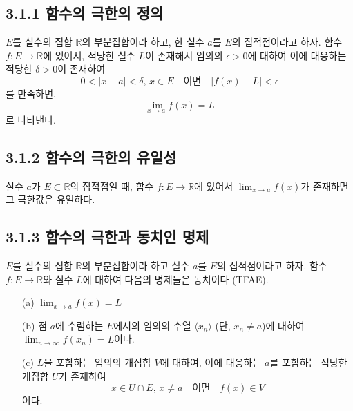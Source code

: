 \documentclass{article}
\begin{document}
\subsection*{\textmd{3.1.1 함수의 극한의 정의}}

$E$를 실수의 집합 $\mathbb{R}$의 부분집합이라 하고, 한 실수 $a$를 $E$의 집적점이라고 하자. 함수 $f: E \to \mathbb{R}$에 있어서, 적당한 실수 $L$이 존재해서 
임의의 $\epsilon > 0$에 대하여 이에 대응하는 적당한 $\delta > 0$이 존재하여 
\[
0 < |x - a| < \delta, \, x \in E \quad \text{이면} \quad |f(x) - L| < \epsilon
\]
를 만족하면, 
\[
\lim_{x \to a} f(x) = L
\]
로 나타낸다.

\subsection*{\textmd{3.1.2 함수의 극한의 유일성}}

실수 $a$가 $E \subset \mathbb{R}$의 집적점일 때, 함수 $f: E \to \mathbb{R}$에 있어서 $\lim_{x \to a} f(x)$가 존재하면 그 극한값은 유일하다.

\subsection*{\textmd{3.1.3 함수의 극한과 동치인 명제}}

$E$를 실수의 집합 $\mathbb{R}$의 부분집합이라 하고 실수 $a$를 $E$의 집적점이라고 하자. 함수 $f: E \to \mathbb{R}$와 실수 $L$에 대하여 다음의 명제들은 동치이다 (TFAE).
\begin{itemize}
    \item[(a)] $\lim_{x \to a} f(x) = L$
    \item[(b)] 점 $a$에 수렴하는 $E$에서의 임의의 수열 $\langle x_n \rangle$ (단, $x_n \neq a$)에 대하여 $\lim_{n \to \infty} f(x_n) = L$이다.
    \item[(c)] $L$을 포함하는 임의의 개집합 $V$에 대하여, 이에 대응하는 $a$를 포함하는 적당한 개집합 $U$가 존재하여 
    \[
    x \in U \cap E, \, x \neq a \quad \text{이면} \quad f(x) \in V
    \]
이다.
\end{itemize}


\subsection{\fontsize{11.5}{13}\selectfont{
함수의 연속성을 $\epsilon$-$\delta$ 방법 이외에도 \textless 함수의 극한 개념 + 근방 개념\textgreater을 이용해 정의할 수 있다. 또한 1장에서 소개한 개집합/폐집합 개념을 이용해 함수의 연속성과 동치인 명제를 알아본다.}}
\end{document}
